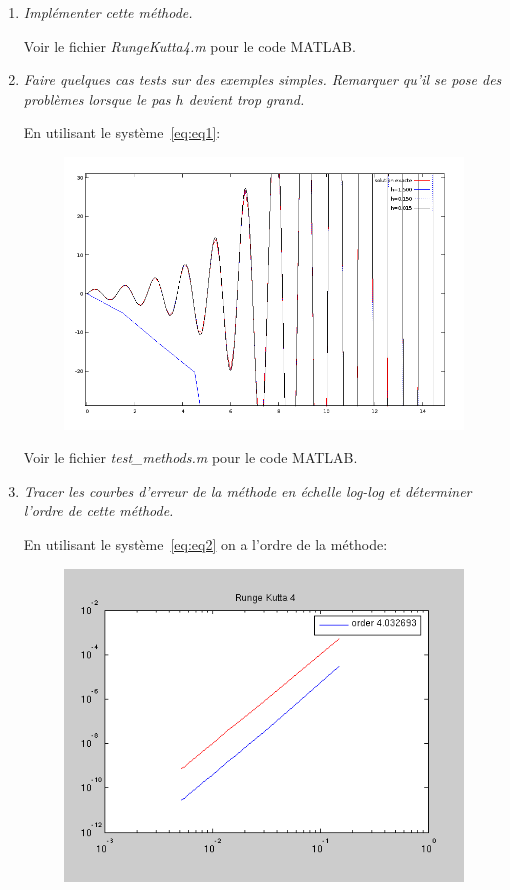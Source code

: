\documentclass[a4paper,10pt]{article}
\begin{document}
\begin{enumerate}
    \item \emph{Implémenter cette méthode.}

    Voir le fichier \emph{RungeKutta4.m} pour le code MATLAB.

    \item \emph{Faire quelques cas tests sur des exemples simples. Remarquer qu'il se
    pose des problèmes lorsque le pas $h$ devient trop grand.}

    En utilisant le système~\eqref{eq:eq1}:
\begin{figure}[h!]
    \centering
    \includegraphics[scale=0.6]{./img/step-runge-kutta.png}
\end{figure}
\clearpage
    Voir le fichier \emph{test\_methods.m} pour le code MATLAB.

    \item \emph{Tracer les courbes d'erreur de la méthode en échelle log-log et
    déterminer l'ordre de cette méthode.}

    En utilisant le système~\eqref{eq:eq2} on a l'ordre de la méthode:
\begin{figure}[h!]
    \centering
    \includegraphics[scale=0.5]{./img/order-runge-kutta-4.png}
\end{figure}


\end{enumerate}
\end{document}
